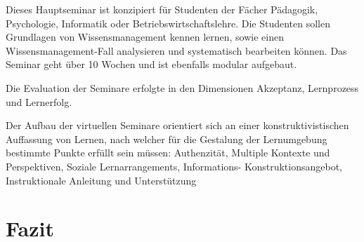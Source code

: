 Dieses Hauptseminar ist konzipiert für Studenten der Fächer Pädagogik,
Psychologie, Informatik oder Betriebswirtschaftslehre. Die Studenten
sollen Grundlagen von Wissensmanagement kennen lernen, sowie einen
Wissensmanagement-Fall analysieren und systematisch bearbeiten können.
Das Seminar geht über 10 Wochen und ist ebenfalls modular aufgebaut.

Die Evaluation der Seminare erfolgte in den Dimensionen Akzeptanz,
Lernprozess und Lernerfolg.

Der Aufbau der virtuellen Seminare orientiert sich an einer
konstruktivistischen Auffassung von Lernen, nach welcher für die
Gestalung der Lernumgebung bestimmte Punkte erfüllt sein müssen:
Authenzität, Multiple Kontexte und Perspektiven, Soziale
Lernarrangements, Informations- Konstruktionsangebot, Instruktionale
Anleitung und Unterstützung

\textbf{}

\textbf{}

\textbf{}

\textbf{}

\section{Fazit}\label{fazit}
